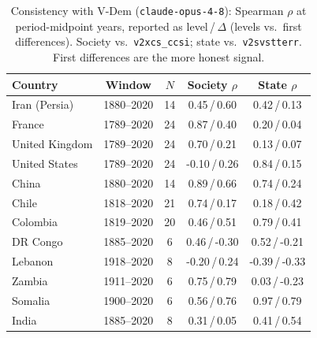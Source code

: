 \begin{table}[t]
\centering
\small
\caption{Consistency with V-Dem (\texttt{claude-opus-4-8}): Spearman $\rho$ at period-midpoint years, reported as level\,/\,$\Delta$ (levels vs.\ first differences). Society vs.\ \texttt{v2xcs\_ccsi}; state vs.\ \texttt{v2svstterr}. First differences are the more honest signal.}
\label{tab:validation}
\begin{tabular}{lcccc}
\toprule
Country & Window & $N$ & Society $\rho$ & State $\rho$ \\
\midrule
Iran (Persia) & 1880--2020 & 14 & 0.45\,/\,0.60 & 0.42\,/\,0.13 \\
France & 1789--2020 & 24 & 0.87\,/\,0.40 & 0.20\,/\,0.04 \\
United Kingdom & 1789--2020 & 24 & 0.70\,/\,0.21 & 0.13\,/\,0.07 \\
United States & 1789--2020 & 24 & -0.10\,/\,0.26 & 0.84\,/\,0.15 \\
China & 1880--2020 & 14 & 0.89\,/\,0.66 & 0.74\,/\,0.24 \\
Chile & 1818--2020 & 21 & 0.74\,/\,0.17 & 0.18\,/\,0.42 \\
Colombia & 1819--2020 & 20 & 0.46\,/\,0.51 & 0.79\,/\,0.41 \\
DR Congo & 1885--2020 & 6 & 0.46\,/\,-0.30 & 0.52\,/\,-0.21 \\
Lebanon & 1918--2020 & 8 & -0.20\,/\,0.24 & -0.39\,/\,-0.33 \\
Zambia & 1911--2020 & 6 & 0.75\,/\,0.79 & 0.03\,/\,-0.23 \\
Somalia & 1900--2020 & 6 & 0.56\,/\,0.76 & 0.97\,/\,0.79 \\
India & 1885--2020 & 8 & 0.31\,/\,0.05 & 0.41\,/\,0.54 \\
\bottomrule
\end{tabular}
\end{table}
